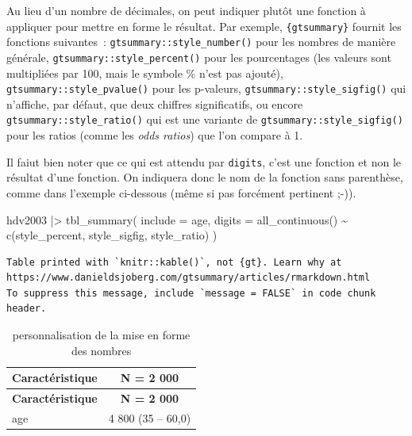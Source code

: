 \documentclass[
  letterpaper,
  DIV=11,
  numbers=noendperiod,
  oneside]{scrreprt}
\newenvironment{Shaded}{\begin{snugshade}}{\end{snugshade}}
\newcommand{\AttributeTok}[1]{\textcolor[rgb]{0.40,0.45,0.13}{#1}}
\newcommand{\FunctionTok}[1]{\textcolor[rgb]{0.28,0.35,0.67}{#1}}
\newcommand{\NormalTok}[1]{\textcolor[rgb]{0.00,0.23,0.31}{#1}}
\newcommand{\SpecialCharTok}[1]{\textcolor[rgb]{0.37,0.37,0.37}{#1}}
\begin{document}
Au lieu d'un nombre de décimales, on peut indiquer plutôt une fonction à
appliquer pour mettre en forme le résultat. Par exemple,
\texttt{\{gtsummary\}} fournit les fonctions suivantes~:
\texttt{gtsummary::style\_number()} pour les nombres de manière
générale, \texttt{gtsummary::style\_percent()} pour les pourcentages
(les valeurs sont multipliées par 100, mais le symbole \% n'est pas
ajouté), \texttt{gtsummary::style\_pvalue()} pour les p-valeurs,
\texttt{gtsummary::style\_sigfig()} qui n'affiche, par défaut, que deux
chiffres significatifs, ou encore \texttt{gtsummary::style\_ratio()} qui
est une variante de
\texttt{gtsummary::\textasciigrave{}\textasciigrave{}style\_sigfig()}
pour les ratios (comme les \emph{odds ratios}) que l'on compare à 1.

Il faiut bien noter que ce qui est attendu par \texttt{digits}, c'est
une fonction et non le résultat d'une fonction. On indiquera donc le nom
de la fonction sans parenthèse, comme dans l'exemple ci-dessous (même si
pas forcément pertinent ;-)).

\begin{Shaded}
\begin{Highlighting}[]
\NormalTok{hdv2003 }\SpecialCharTok{|\textgreater{}}
  \FunctionTok{tbl\_summary}\NormalTok{(}
    \AttributeTok{include =}\NormalTok{ age,}
    \AttributeTok{digits =} 
      \FunctionTok{all\_continuous}\NormalTok{() }\SpecialCharTok{\textasciitilde{}} \FunctionTok{c}\NormalTok{(style\_percent, style\_sigfig, style\_ratio)}
\NormalTok{  )}
\end{Highlighting}
\end{Shaded}

\begin{verbatim}
Table printed with `knitr::kable()`, not {gt}. Learn why at
https://www.danieldsjoberg.com/gtsummary/articles/rmarkdown.html
To suppress this message, include `message = FALSE` in code chunk header.
\end{verbatim}

\hypertarget{tbl-digits-2}{}
\begin{longtable}[]{@{}lc@{}}
\caption{\label{tbl-digits-2}personnalisation de la mise en forme des
nombres}\tabularnewline
\toprule()
\textbf{Caractéristique} & \textbf{N = 2 000} \\
\midrule()
\endfirsthead
\toprule()
\textbf{Caractéristique} & \textbf{N = 2 000} \\
\midrule()
\endhead
age & 4 800 (35 -- 60,0) \\
\bottomrule()
\end{longtable}
\end{document}
